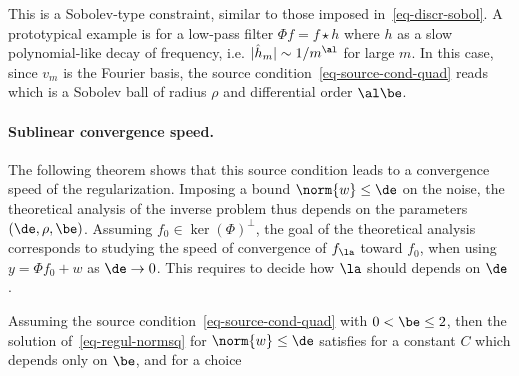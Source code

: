 This is a Sobolev-type constraint, similar to those imposed in~\ref{eq-discr-sobol}. A prototypical example is for a low-pass filter $\Phi f = f \star h$ where $h$ as a slow polynomial-like decay of frequency, i.e. $|\hat h_m| \sim 1/m^{\al}$ for large $m$. In this case, since $v_m$ is the Fourier basis, the source condition~\eqref{eq-source-cond-quad} reads
which is a Sobolev ball of radius $\rho$ and differential order $\al\be$. 


\paragraph{Sublinear convergence speed.}

The following theorem shows that this source condition leads to a convergence speed of the regularization. 
%
Imposing a bound $\norm{w} \leq \de$ on the noise, the theoretical analysis of the inverse problem thus depends on the parameters $(\de,\rho,\be)$. Assuming $f_0 \in \ker(\Phi)^\bot$, the goal of the theoretical analysis corresponds to studying the speed of convergence of $f_\la$ toward $f_0$, when using $y=\Phi f_0+w$ as $\de \rightarrow 0$. This requires to decide how $\la$ should depends on $\de$.


\begin{thm}\label{thm-sublin-quad}
	Assuming the source condition~\eqref{eq-source-cond-quad} with $0 < \be \leq 2$, then the solution of~\eqref{eq-regul-normsq} for $\norm{w} \leq \de$ satisfies
	for a constant $C$ which depends only on $\be$, and
	for a choice 
\end{thm}

